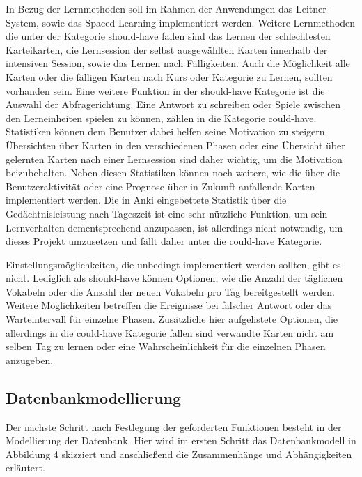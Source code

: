 In Bezug der Lernmethoden soll im Rahmen der Anwendungen das Leitner-System, sowie das Spaced Learning implementiert werden. Weitere Lernmethoden die unter der Kategorie should-have fallen sind das Lernen der schlechtesten Karteikarten, die Lernsession der selbst ausgewählten Karten innerhalb der intensiven Session, sowie das Lernen nach Fälligkeiten. Auch die Möglichkeit alle Karten oder die fälligen Karten nach Kurs oder Kategorie zu Lernen, sollten vorhanden sein. Eine weitere Funktion in der should-have Kategorie ist die Auswahl der Abfragerichtung. Eine Antwort zu schreiben oder Spiele zwischen den Lerneinheiten spielen zu können, zählen in die Kategorie could-have. \\

Statistiken können dem Benutzer dabei helfen seine Motivation zu steigern. Übersichten über Karten in den verschiedenen Phasen oder eine Übersicht über gelernten Karten nach einer Lernsession sind daher wichtig, um die Motivation beizubehalten. Neben diesen Statistiken können noch weitere, wie die über die Benutzeraktivität oder eine Prognose über in Zukunft anfallende Karten implementiert werden. Die in Anki eingebettete Statistik über die Gedächtnisleistung nach Tageszeit ist eine sehr nützliche Funktion, um sein Lernverhalten dementsprechend anzupassen, ist allerdings nicht notwendig, um dieses Projekt umzusetzen und fällt daher unter die could-have Kategorie.

Einstellungsmöglichkeiten, die unbedingt implementiert werden sollten, gibt es nicht. Lediglich als should-have können Optionen, wie die Anzahl der täglichen Vokabeln oder die Anzahl der neuen Vokabeln pro Tag bereitgestellt werden. Weitere Möglichkeiten betreffen die Ereignisse bei falscher Antwort oder das Warteintervall für einzelne Phasen. Zusätzliche hier aufgelistete Optionen, die allerdings in die could-have Kategorie fallen sind verwandte Karten nicht am selben Tag zu lernen oder eine Wahrscheinlichkeit für die einzelnen Phasen anzugeben. 




\subsection{Datenbankmodellierung}
Der nächste Schritt nach Festlegung der geforderten Funktionen besteht in der Modellierung der Datenbank. Hier wird im ersten Schritt das Datenbankmodell in Abbildung 4 skizziert und anschließend die Zusammenhänge und Abhängigkeiten erläutert. 

